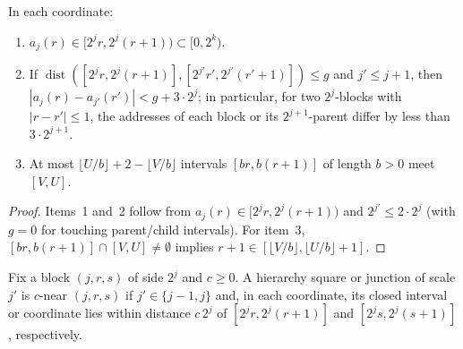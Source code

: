 \begin{lemma}
    \label{lem:peps_dyadic_address_locality}
    \leanok
    In each coordinate:
    \begin{enumerate}
        \item $a_j(r)\in[2^jr,2^j(r+1))\subset[0,2^k)$. %
        \item If $\operatorname{dist}([2^jr,2^j(r+1)],[2^{j'}r',2^{j'}(r'+1)])\le g$
              and $j'\le j+1$, then $|a_j(r)-a_{j'}(r')|<g+3\cdot2^j$; in
              particular, for two $2^j$-blocks with $|r-r'|\le1$, the addresses of
              each block or its $2^{j+1}$-parent differ by less than
              $3\cdot2^{j+1}$.
        \item At most $\lfloor U/b\rfloor+2-\lfloor V/b\rfloor$ intervals
              $[br,b(r+1)]$ of length $b>0$ meet $[V,U]$.
    \end{enumerate}
\end{lemma}

\begin{proof}\leanok
    Items~1 and~2 follow from $a_j(r)\in[2^jr,2^j(r+1))$ and $2^{j'}\le2\cdot2^j$
    (with $g=0$ for touching parent/child intervals). For item~3,
    $[br,b(r+1)]\cap[V,U]\ne\emptyset$ implies
    $r+1\in[\lfloor V/b\rfloor,\lfloor U/b\rfloor+1]$.
\end{proof}

\begin{definition}
    \label{def:peps_dyadic_near_block}
    \leanok
    Fix a block $(j,r,s)$ of side $2^j$ and $c\ge0$. A hierarchy square or
    junction of scale $j'$ is $c$-near $(j,r,s)$ if $j'\in\{j-1,j\}$ and, in each
    coordinate, its closed interval or coordinate lies within distance $c\,2^j$ of
    $[2^jr,2^j(r+1)]$ and $[2^js,2^j(s+1)]$, respectively.
\end{definition}

